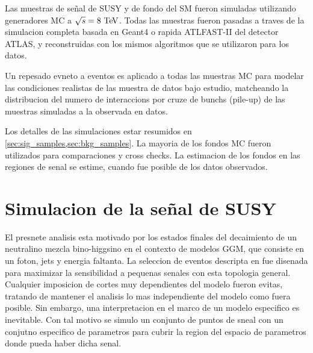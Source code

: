Las muestras de se\~nal de SUSY y de fondo del SM fueron simuladas utilizando generadores MC
a $\sqrt{s}=8\tev$.
Todas las muestras fueron pasadas a traves de la simulacion completa basada en Geant4\cite{Geant4,AtlasSim} o rapida
ATLFAST-II\cite{Richter-Was:683751} del detector ATLAS, y reconstruidas con los mismos algoritmos
que se utilizaron para los datos.

Un repesado evneto a eventos es aplicado a todas las muestras MC para modelar las condiciones
realistas de las muestra de datos bajo estudio, matcheando la distribucion del numero de interaccions
por cruze de bunchs (pile-up) de las muestras simuladas a la observada en datos.

Los detalles de las simulaciones estar resumidos en \cref{sec:sig_samples,sec:bkg_samples}.
La mayoria de los fondos MC fueron utilizados para comparaciones y cross checks.
La estimacion de los fondos en las regiones de senal se estime, cuando fue posible de los
datos observados.





\section{Simulacion de la se\~nal de SUSY}
\label{sec:sig_samples}

El presnete analisis esta motivado por los estados finales del decaimiento de un
neutralino mezcla bino-higgsino en el contexto de modelos GGM, que consiste en
un foton, jets y energia faltanta. La seleccion de eventos descripta en {\XXX}
fue disenada para maximizar la sensibilidad a pequenas senales con esta
topologia general. Cualquier imposicion de cortes muy dependientes del modelo
fueron evitas, tratando de mantener el analisis lo mas independiente del modelo
como fuera posible. Sin embargo, una interpretacion en el marco de un modelo
especifico es inevitable. Con tal motivo se simulo un conjunto de puntos de
sneal con un conjutno especifico de parametros para cubrir la region del espacio
de parametros donde pueda haber dicha senal.


